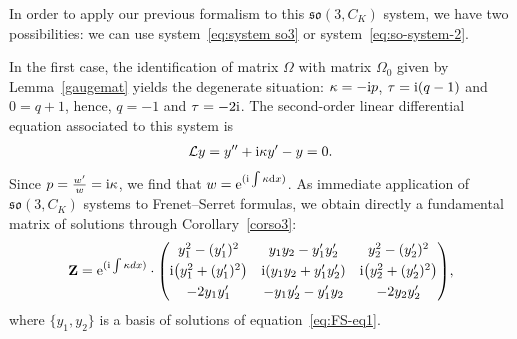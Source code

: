 \documentclass[pdftex]{sigma}%
\numberwithin{equation}{section}
\begin{document}
In order to apply our previous formalism to this $\mathfrak{so}(3, C_K)$ system, we have two possibilities: we can use system~\eqref{eq:system so3} or system~\eqref{eq:so-system-2}.

In the first case, the identification of matrix $\Omega$ with matrix $\Omega_0$ given by Lemma~\ref{gaugemat} yields the degenerate situation: $\kappa = -{\rm i}p $, $\tau = {\rm i} (q-1)$ and $0 = q+1$, hence, $q= -1$ and $\tau= -2{\rm i}$. The second-order linear differential equation associated to this system is
\begin{gather}\label{eq:FS-eq1}
 \mathcal{L} y = y'' +{\rm i}\kappa y' -y =0.
\end{gather}
Since $p= \frac{w'}{w} ={\rm i} \kappa$, we find that $w = {\rm e}^{({\rm i} \int \kappa {\rm d}x)}$. As immediate application of $\mathfrak{so}(3, C_K)$ systems to Frenet--Serret formulas, we obtain directly a fundamental matrix of solutions through Corollary~\ref{corso3}:
\begin{gather*}
 \mathbf{Z} = {\rm e}^{({\rm i} \int \kappa dx)} \cdot
\begin{pmatrix}
y_1^2 - (y_1')^2 & y_1 y_2 - y_1' y_2' & y_2^2 -(y_2')^{2} \\[3pt]
{\rm i} \big(y_1^2 + (y_1')^{2}\big) & {\rm i} (y_1 y_2 + y_1' y_2') & {\rm i} \big(y_2^2 + (y_2')^{2}\big) \\[3pt]
-2 y_1 y_1' & - y_1 y_2' - y_1' y_2 & -2 y_2 y_2' \end{pmatrix}\!,
\end{gather*}
where $\{ y_1, y_2\}$ is a basis of solutions of equation~\eqref{eq:FS-eq1}.
\end{document}

